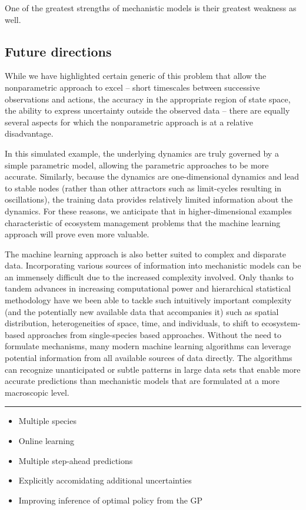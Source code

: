 \documentclass[author-year, review]{elsarticle} %
\begin{document}
One of the greatest strengths of mechanistic models is their greatest
weakness as well.

\subsection{Future directions}

While we have highlighted certain generic of this problem that allow the
nonparametric approach to excel -- short timescales between successive
observations and actions, the accuracy in the appropriate region of
state space, the ability to express uncertainty outside the observed
data -- there are equally several aspects for which the nonparametric
approach is at a relative disadvantage.

In this simulated example, the underlying dynamics are truly governed by
a simple parametric model, allowing the parametric approaches to be more
accurate. Similarly, because the dynamics are one-dimensional dynamics
and lead to stable nodes (rather than other attractors such as
limit-cycles resulting in oscillations), the training data provides
relatively limited information about the dynamics. For these reasons, we
anticipate that in higher-dimensional examples characteristic of
ecosystem management problems that the machine learning approach will
prove even more valuable.

The machine learning approach is also better suited to complex and
disparate data. Incorporating various sources of information into
mechanistic models can be an immensely difficult due to the increased
complexity involved. Only thanks to tandem advances in increasing
computational power and hierarchical statistical methodology have we
been able to tackle such intuitively important complexity (and the
potentially new available data that accompanies it) such as spatial
distribution, heterogeneities of space, time, and individuals, to shift
to ecosystem-based approaches from single-species based approaches.
Without the need to formulate mechanisms, many modern machine learning
algorithms can leverage potential information from all available sources
of data directly. The algorithms can recognize unanticipated or subtle
patterns in large data sets that enable more accurate predictions than
mechanistic models that are formulated at a more macroscopic level.

\begin{center}\rule{3in}{0.4pt}\end{center}

\begin{itemize}
\itemsep1pt\parskip0pt
\item
  Multiple species
\item
  Online learning
\item
  Multiple step-ahead predictions
\item
  Explicitly accomidating additional uncertainties
\item
  Improving inference of optimal policy from the GP
\end{itemize}
\end{document}
